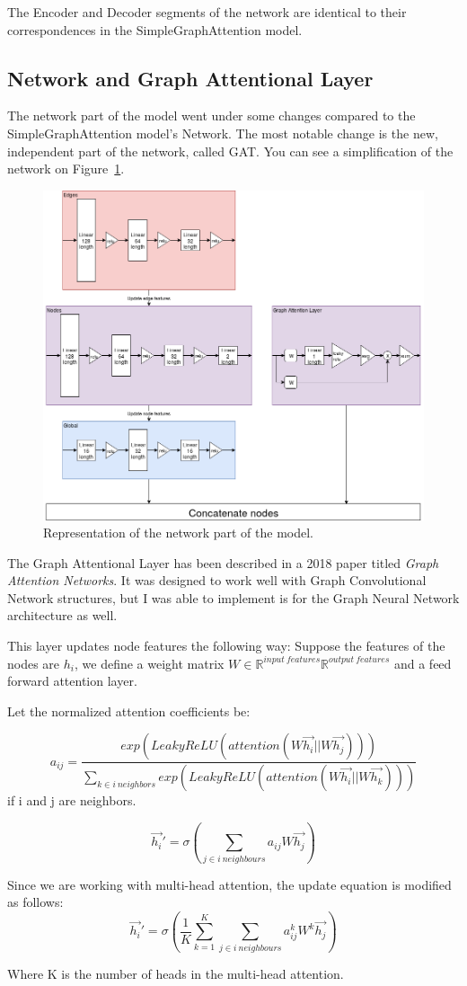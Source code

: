The Encoder and Decoder segments of the network are identical to their correspondences in the SimpleGraphAttention model.

\subsection{Network and Graph Attentional Layer}
The network part of the model went under some changes compared to the SimpleGraphAttention model's Network. The most notable change is the new, independent part of the network, called GAT. You can see a simplification of the network on Figure~\ref{fig:graph-attention1-network}.

\begin{figure}[!ht]
	\centering
	\includegraphics[scale=0.5]{figures/GA1_network.png}
	\caption{Representation of the network part of the model.}
	\label{fig:graph-attention1-network}
\end{figure}

The Graph Attentional Layer has been described in a 2018 paper titled \textit{Graph Attention Networks}\cite{GAT}. It was designed to work well with Graph Convolutional Network structures, but I was able to implement is for the Graph Neural Network architecture as well.

This layer updates node features the following way: Suppose the features of the nodes are \(h_i\), we define a weight matrix \(W \in \mathbb{R}^{input\ features} \mathbb{R}^{output\ features} \) and a feed forward attention layer.

Let the normalized attention coefficients be:

\[a_{ij} =  \frac{exp(LeakyReLU(attention(W\vec{h_i} || W\vec{h_j})))}{\sum_{k \in i\ neighbors} exp(LeakyReLU(attention(W\vec{h_i} || W\vec{h_k})))}\]
if i and j are neighbors.

\[\vec{h_i}' = \sigma(\sum_{j \in i\ neighbours}a_{ij}W\vec{h_j})\]

Since we are working with multi-head attention, the update equation is modified as follows:
\[\vec{h_i}' = \sigma(\frac{1}{K} \sum_{k=1}^{K}\sum_{j \in i\ neighbours}a_{ij}^kW^k\vec{h_j})\]

Where K is the number of heads in the multi-head attention.
